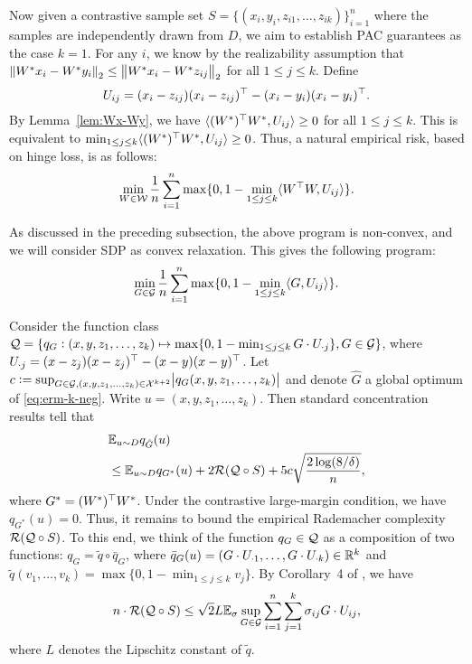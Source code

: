 Now given a contrastive sample set $S = \{ (x_i, y_i, z_{i1}, \dots, z_{ik})\}_{i=1}^n$ where the samples are independently drawn from $D$, we aim to establish PAC guarantees as the case $k=1$. For any $i$, we know by the realizability assumption that $\left\lVert W^* x_i - W^* y_i \right\rVert_{2} \leq \left\lVert W^* x_i - W^* z_{ij} \right\rVert_{2}$ for all $1 \leq j \leq k$. Define
\begin{equation}
U_{ij} = (x_i - z_{ij})(x_i - z_{ij})^{\top} - (x_i - y_i)(x_i - y_i)^{\top}.
\end{equation}
By Lemma~\ref{lem:Wx-Wy}, we have $\langle (W^*)^{\top} W^*, U_{ij} \rangle \geq 0$ for all $1 \leq j \leq k$. This is equivalent to $\min_{1 \leq j \leq k} \langle (W^*)^{\top} W^*, U_{ij} \rangle \geq 0$.
Thus, a natural empirical risk, based on hinge loss, is as follows:
\begin{equation}
\min_{W \in \mathcal{W}} \frac{1}{n}\sum_{i=1}^{n} \max\{0, 1 - \min_{1 \leq j \leq k} \langle W^{\top} W, U_{ij} \rangle \}.
\end{equation}

As discussed in the preceding subsection, the above program is non-convex, and we will consider SDP as convex relaxation. This gives the following program:
\begin{equation}\label{eq:erm-k-neg}
\min_{G \in \mathcal{G}} \frac{1}{n}\sum_{i=1}^{n} \max\{0, 1 - \min_{1 \leq j \leq k} \langle G, U_{ij} \rangle \}.
\end{equation}

Consider the function class $\mathcal{Q} = \{q_G: (x, y, z_1, \dots, z_k) \mapsto \max\{0, 1 - \min_{1 \leq j \leq k} G \cdot U_{\cdot j} \}, G \in \mathcal{G} \}$, where $U_{\cdot j} =(x - z_j)(x - z_j)^{\top} - (x - y)(x-y)^{\top}$. Let $c := \sup_{G \in \mathcal{G}, (x, y, z_1, \dots, z_k) \in \mathcal{X}^{k+2}} \abs{ q_G(x, y, z_1, \dots, z_k) }$ and denote $\hat{G}$ a global optimum of \eqref{eq:erm-k-neg}. Write $u = (x, y, z_1, \dots, z_k)$. Then standard concentration results tell that 
\begin{align*}
&\mathbb{E}_{u \sim D} q_{\hat{G}}(u) \\
&\leq \mathbb{E}_{u \sim D} q_{G^*}(u) + 2 \mathcal{R}( \mathcal{Q} \circ S) + 5c \sqrt{\frac{2 \log(8/\delta)}{n}},
\end{align*}
where $G^* = (W^*)^{\top} W^*$. Under the contrastive large-margin condition, we have $q_{G^*}(u) = 0$. Thus, it remains to bound the empirical Rademacher complexity $\mathcal{R}( \mathcal{Q} \circ S)$. To this end, we think of the function $q_G \in \mathcal{Q}$ as a composition of two functions: $q_G = \tilde{q} \circ \bar{q}_G$, where $\bar{q}_G(u) = (G \cdot U_{\cdot 1}, \dots, G \cdot U_{\cdot k}) \in \mathbb{R}^k$ and $\tilde{q}(v_1, \dots, v_k) = \max\{0, 1 - \min_{1 \leq j \leq k} v_j\}$. By Corollary~4 of \citet{maurer16}, we have
\begin{equation}
n \cdot \mathcal{R}(\mathcal{Q} \circ S) \leq \sqrt{2} L \mathbb{E}_{\sigma} \sup_{G \in \mathcal{G}} \sum_{i=1}^{n} \sum_{j=1}^{k} \sigma_{ij} G \cdot U_{ij},
\end{equation}
where $L$ denotes the Lipschitz constant of $\tilde{q}$.

